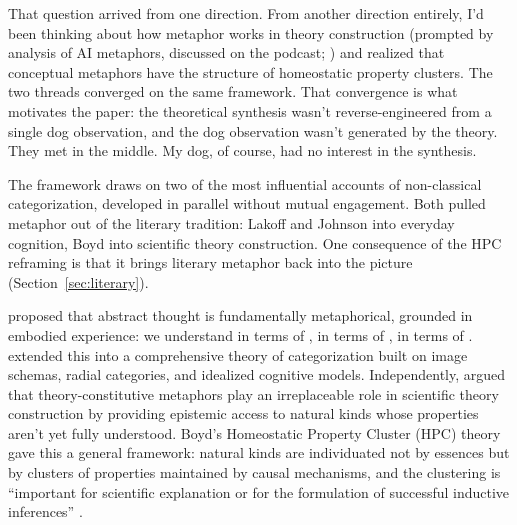 \documentclass[12pt]{article}
\begin{document}
That question arrived from one direction. From another direction entirely, I'd been thinking about how metaphor works in theory construction (prompted by  analysis of AI metaphors, discussed on the  podcast; \citealt{cooperrider2026}) and realized that conceptual metaphors have the structure of homeostatic property clusters. The two threads converged on the same framework. That convergence is what motivates the paper: the theoretical synthesis wasn't reverse-engineered from a single dog observation, and the dog observation wasn't generated by the theory. They met in the middle. My dog, of course, had no interest in the synthesis.

The framework draws on two of the most influential accounts of non-classical categorization, developed in parallel without mutual engagement. Both pulled metaphor out of the literary tradition: Lakoff and Johnson into everyday cognition, Boyd into scientific theory construction. One consequence of the HPC reframing is that it brings literary metaphor back into the picture (Section~\ref{sec:literary}).

\textcite{lakoff1980} proposed that abstract thought is fundamentally metaphorical, grounded in embodied experience: we understand  in terms of ,  in terms of ,  in terms of . \textcite{lakoff1987} extended this into a comprehensive theory of categorization built on image schemas, radial categories, and idealized cognitive models. Independently, \textcite{boyd1979} argued that theory-constitutive metaphors play an irreplaceable role in scientific theory construction by providing epistemic access to natural kinds whose properties aren't yet fully understood. Boyd's Homeostatic Property Cluster (HPC) theory \citep{boyd1989, boyd1999} gave this a general framework: natural kinds are individuated not by essences but by clusters of properties maintained by causal mechanisms, and the clustering is \enquote{important for scientific explanation or for the formulation of successful inductive inferences} \citep[527]{boyd1979}.
\end{document}
